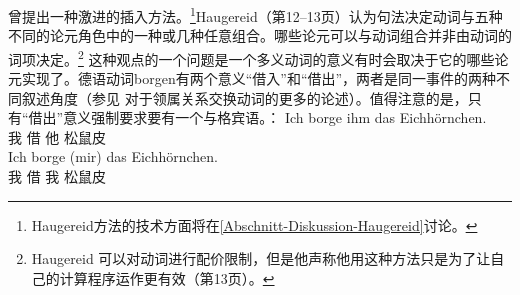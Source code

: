 \begin{exe}
\begin{xlist}[iv.]
\begin{exe}
\begin{xlist}[iv.]
 \citet{Haugereid2009a}曾提出一种激进的插入方法。\footnote{%
  Haugereid方法的技术方面将在\ref{Abschnitt-Diskussion-Haugereid}讨论。
}Haugereid（第12--13页）认为句法决定动词与五种不同的论元角色中的一种或几种任意组合。哪些论元可以与动词组合并非由动词的词项决定。\footnote{%
  Haugereid 可以对动词进行配价限制，但是他声称他用这种方法只是为了让自己的计算程序运作更有效（第13页）。
}
这种观点的一个问题是一个多义动词的意义有时会取决于它的哪些论元实现了。德语动词borgen有两个意义“借入”和“借出”，两者是同一事件的两种不同叙述角度（参见 对于领属关系交换动词的更多的论述）。值得注意的是，只有“借出”意义强制要求要有一个与格宾语。\citep[]{MuellerGTBuch1}：
\eal
\ex 
\gll Ich borge ihm das Eichhörnchen.\\
     我   借  他  松鼠皮\\
\ex 
\gll Ich borge (mir) das Eichhörnchen.\\
     我 借 我  松鼠皮\\

\end{xlist}
\end{exe}
\end{xlist}
\end{exe}
